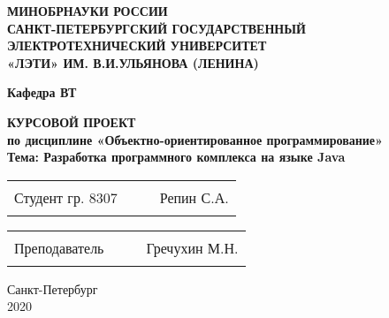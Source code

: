 \begin{titlepage}
\begin{center}
    \uppercase{\textbf{Минобрнауки России\\
            Санкт-Петербургский государственный\\
            электротехнический университет\\
            «ЛЭТИ» им. В.И.Ульянова (Ленина)
    }}
    \vspace{0.25cm}

    \textbf{Кафедра ВТ}
    \vfill

    \uppercase{\textbf{\large{
        Курсовой проект
    }}}
    \\
    \textbf{\large{
      по дисциплине «Объектно-ориентированное программирование»\\
      Тема: Разработка программного комплекса на языке Java\\
      \vspace{0.5cm}
    }}
  \bigskip
\end{center}
\vfill

\begin{tabularx}{\textwidth}{@{}lcXr}
    Студент гр. 8307 & \hspace{1.6cm} & \rule{5cm}{1pt} & Репин С.А.
\end{tabularx}

\vspace{0.5cm}

\noindent
\begin{tabularx}{\textwidth}{@{}lcXr}
    Преподаватель & \hspace{2cm} & \rule{5cm}{1pt} & Гречухин М.Н.
\end{tabularx}

\hfill \break
\hfill \break

\begin{center}
  Санкт-Петербург\\2020
\end{center}

\end{titlepage}

